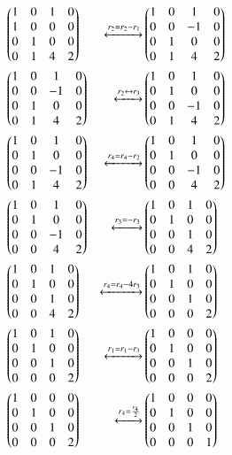 \documentclass[journal,12pt,twocolumn]{IEEEtran}
\begin{document}
\begin{align}
& \begin{pmatrix}1 & 0 & 1 & 0 \\ 1 & 0 & 0 & 0 \\ 0 & 1 & 0 & 0 \\ 0 & 1 & 4 & 2\end{pmatrix} &  \xleftrightarrow[]{r_2=r_2-r_1} &
\begin{pmatrix}1 & 0 & 1 & 0 \\ 0 & 0 & -1 & 0 \\ 0 & 1 & 0 & 0 \\ 0 & 1 & 4 & 2\end{pmatrix} \\
& \begin{pmatrix}1 & 0 & 1 & 0 \\ 0 & 0 & -1 & 0 \\ 0 & 1 & 0 & 0 \\ 0 & 1 & 4 &2\end{pmatrix}      &\xleftrightarrow[]{r_2 \leftrightarrow r_3} &\begin{pmatrix}1 & 0 & 1 & 0 \\ 0 & 1 & 0 & 0 \\ 0 & 0 & -1 & 0 \\0&1&4& 2\end{pmatrix} \\
& \begin{pmatrix}1 & 0 & 1 & 0 \\ 0 & 1 & 0 & 0 \\ 0 & 0 & -1 & 0 \\0 & 1 & 4 & 2\end{pmatrix}&\xleftrightarrow[]{r_4=r_4-r_2}&
\begin{pmatrix}1 & 0 & 1 & 0 \\ 0 & 1 & 0 & 0 \\ 0 & 0 & -1 & 0 \\0 & 0 & 4 & 2\end{pmatrix} \\
& \begin{pmatrix}1 & 0 & 1 & 0 \\ 0 & 1 & 0 & 0 \\ 0 & 0 & -1 & 0 \\0 & 0 & 4 & 2\end{pmatrix}&\xleftrightarrow[]{r_3=-r_3}&
\begin{pmatrix}1 & 0 & 1 & 0 \\ 0 & 1 & 0 & 0 \\ 0 & 0 & 1 & 0 \\0 & 0 & 4 & 2\end{pmatrix} \\
& \begin{pmatrix}1 & 0 & 1 & 0 \\ 0 & 1 & 0 & 0 \\ 0 & 0 & 1 & 0 \\0 & 0 & 4 & 2\end{pmatrix} &\xleftrightarrow[]{r_4=r_4-4r_3}& \begin{pmatrix}1 & 0 & 1 & 0 \\ 0 & 1 & 0 & 0 \\ 0 & 0 & 1 & 0 \\0& 0& 0&2\end{pmatrix} \\ 
&\begin{pmatrix}1 & 0 & 1 & 0 \\ 0 & 1 & 0 & 0 \\ 0 & 0 & 1 & 0 \\0& 0& 0&2\end{pmatrix}&\xleftrightarrow[]{r_1=r_1-r_3}&
\begin{pmatrix}1 & 0 & 0 & 0 \\ 0 & 1 & 0 & 0 \\ 0 & 0 & 1 & 0 \\0& 0& 0&2\end{pmatrix}\\
& \begin{pmatrix}1 & 0 & 0 & 0 \\ 0 & 1 & 0 & 0 \\ 0 & 0 & 1 & 0 \\0& 0& 0&2\end{pmatrix} &\xleftrightarrow[]{r_4=\frac{r_4}{2}}& \begin{pmatrix}1 & 0 & 0 & 0 \\ 0 & 1 & 0 & 0 \\ 0 & 0 & 1 & 0 \\0& 0& 0&1\end{pmatrix}\label{2}
\end{align}
\end{document}
